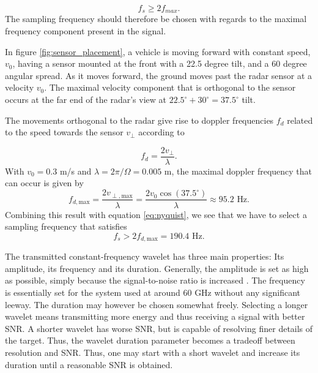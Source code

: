 \begin{equation}
\label{eq:nyquist}
		f_{s} \geq 2f_{max}.
\end{equation}
The sampling frequency should therefore be chosen with regards to the maximal frequency component present in the signal. 

In figure \ref{fig:sensor_placement}, a vehicle is moving forward with constant speed, $v_0$, having a sensor mounted at the front with a 22.5 degree tilt, and a 60 degree angular spread. As it moves forward, the ground moves past the radar sensor at a velocity $v_0$. The maximal velocity component that is orthogonal to the sensor occurs at the far end of the radar's view at $22.5^\circ + 30^\circ = 37.5^\circ$ tilt. 

The movements orthogonal to the radar give rise to doppler frequencies $f_d$ related to the speed towards the sensor $v_\perp$ according to \citep{lien_gillian_karagozler_amihood_schwesig_olson_raja_poupyrev_2016}

\begin{equation}
	f_{d} = \frac{2v_\perp}{\lambda}.
\end{equation}
With $v_0=0.3$ m/s and $\lambda = 2\pi/\Omega = 0.005$ m, the maximal doppler frequency that can occur is given by 
\begin{equation}
	f_{d,\textrm{max}} 
	=\frac{2 v_{\perp, \textrm{max}}}{\lambda} 
	= \frac{2 v_0\cos(37.5^\circ)}{\lambda}
	\approx 95.2 \text { Hz}.
\end{equation}
Combining this result with equation \eqref{eq:nyquist}, we see that we have to select  a sampling frequency that satisfies
\begin{equation}
	f_s > 2f_{d,\textrm{max}} = 190.4 \text{ Hz}.
\end{equation}

The transmitted constant-frequency wavelet has three main properties: Its amplitude, its frequency and its duration. Generally, the amplitude is set as high as possible, simply because the signal-to-noise ratio is increased \citep{richards_2014}. The frequency is essentially set for the system used at around 60 GHz without any significant leeway. The duration may however be chosen somewhat freely. Selecting a longer wavelet means transmitting more energy and thus receiving a signal with better SNR. A shorter wavelet has worse SNR, but is capable of resolving finer details of the target. Thus, the wavelet duration parameter becomes a tradeoff between resolution and SNR. Thus, one may start with a short wavelet and increase its duration until a reasonable SNR is obtained.  

